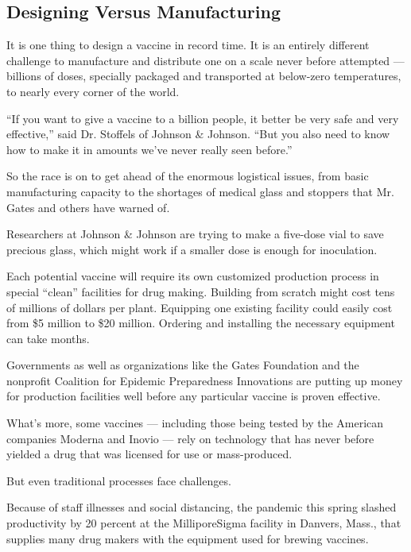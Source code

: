 \hypertarget{designing-versus-manufacturing}{%
\subsection{Designing Versus
Manufacturing}\label{designing-versus-manufacturing}}

It is one thing to design a vaccine in record time. It is an entirely
different challenge to manufacture and distribute one on a scale never
before attempted --- billions of doses, specially packaged and
transported at below-zero temperatures, to nearly every corner of the
world.

``If you want to give a vaccine to a billion people, it better be very
safe and very effective,'' said Dr. Stoffels of Johnson \& Johnson.
``But you also need to know how to make it in amounts we've never really
seen before.''

So the race is on to get ahead of the enormous logistical issues, from
basic manufacturing capacity to the shortages of medical glass and
stoppers that Mr. Gates and others have warned of.

Researchers at Johnson \& Johnson are trying to make a five-dose vial to
save precious glass, which might work if a smaller dose is enough for
inoculation.

Each potential vaccine will require its own customized production
process in special ``clean'' facilities for drug making. Building from
scratch might cost tens of millions of dollars per plant. Equipping one
existing facility could easily cost from \$5 million to \$20 million.
Ordering and installing the necessary equipment can take months.

Governments as well as organizations like the Gates Foundation and the
nonprofit Coalition for Epidemic Preparedness Innovations are putting up
money for production facilities well before any particular vaccine is
proven effective.

What's more, some vaccines --- including those being tested by the
American companies Moderna and Inovio --- rely on technology that has
never before yielded a drug that was licensed for use or mass-produced.

But even traditional processes face challenges.

Because of staff illnesses and social distancing, the pandemic this
spring slashed productivity by 20 percent at the MilliporeSigma facility
in Danvers, Mass., that supplies many drug makers with the equipment
used for brewing vaccines.


